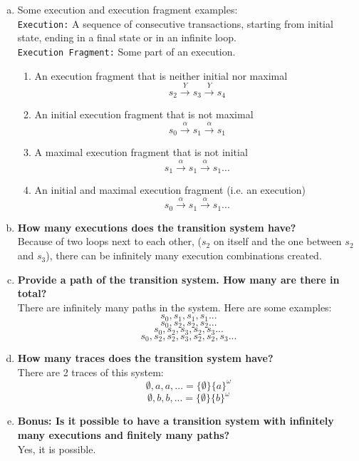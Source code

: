 \documentclass{article}
\begin{document}
\begin{enumerate}[(a)]
    \item{Some execution and execution fragment examples:} \\
    \texttt{Execution:} A sequence of consecutive transactions, starting from initial state, ending in a final state or in an infinite loop. \\
    \texttt{Execution Fragment:} Some part of an execution. \\
    \begin{enumerate}[•]
        \item {An execution fragment that is neither initial nor maximal}
        $$
            s_2 \xrightarrow{Y} s_3 \xrightarrow{Y} s_4
        $$
        \item  {An initial execution fragment that is not maximal}
        $$
            s_0 \xrightarrow{\alpha} s_1 \xrightarrow{\alpha} s_1
        $$
        \item  {A maximal execution fragment that is not initial}
        $$
            s_1 \xrightarrow{\alpha} s_1 \xrightarrow{\alpha} s_1 ...
        $$
        \item  {An initial and maximal execution fragment (i.e. an execution)}
        $$
            s_0 \xrightarrow{\alpha} s_1 \xrightarrow{\alpha} s_1 ...
        $$
    \end{enumerate}
    
    \item \textbf{How many executions does the transition system have?}\\
    Because of two loops next to each other, ($s_2$ on itself and the one between $s_2$ and $s_3$), there can be infinitely many execution combinations created. 
    \item \textbf{Provide a path of the transition system. How many are there in total?}\\
    There are infinitely many paths in the system. Here are some examples:
    $$ s_0, s_1, s_1, s_1 ...$$
    $$ s_0, s_2, s_2, s_2 ...$$
    $$ s_0, s_2, s_3, s_2, s_3...$$
    $$ s_0, s_2, s_2, s_3, s_2, s_2, s_3...$$
    \item \textbf{How many traces does the transition system have?}\\
    There are 2 traces of this system:
    $$ \emptyset, a, a, ... = \{\emptyset \} \{a\}^\omega $$
    $$ \emptyset, b, b, ... = \{\emptyset \} \{b\}^\omega $$
    \item \textbf{Bonus: Is it possible to have a transition system with infinitely many executions and finitely many paths?}\\
    Yes, it is possible.
    \begin{figure}[h] 
        \centering
        \label{fig:bonus}
    \end{figure}
\end{enumerate}
\end{document}
